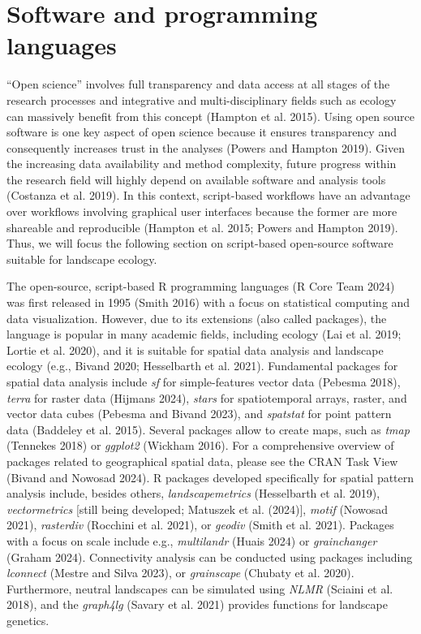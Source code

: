 \documentclass[
  10pt,
  a4paperpaper,
]{article}
\begin{document}
\section{Software and programming
languages}\label{software-and-programming-languages}

``Open science'' involves full transparency and data access at all
stages of the research processes and integrative and multi-disciplinary
fields such as ecology can massively benefit from this concept (Hampton
et al. 2015). Using open source software is one key aspect of open
science because it ensures transparency and consequently increases trust
in the analyses (Powers and Hampton 2019). Given the increasing data
availability and method complexity, future progress within the research
field will highly depend on available software and analysis tools
(Costanza et al. 2019). In this context, script-based workflows have an
advantage over workflows involving graphical user interfaces because the
former are more shareable and reproducible (Hampton et al. 2015; Powers
and Hampton 2019). Thus, we will focus the following section on
script-based open-source software suitable for landscape ecology.

The open-source, script-based R programming languages (R Core Team 2024)
was first released in 1995 (Smith 2016) with a focus on statistical
computing and data visualization. However, due to its extensions (also
called packages), the language is popular in many academic fields,
including ecology (Lai et al. 2019; Lortie et al. 2020), and it is
suitable for spatial data analysis and landscape ecology (e.g., Bivand
2020; Hesselbarth et al. 2021). Fundamental packages for spatial data
analysis include \emph{sf} for simple-features vector data (Pebesma
2018), \emph{terra} for raster data (Hijmans 2024), \emph{stars} for
spatiotemporal arrays, raster, and vector data cubes (Pebesma and Bivand
2023), and \emph{spatstat} for point pattern data (Baddeley et al.
2015). Several packages allow to create maps, such as \emph{tmap}
(Tennekes 2018) or \emph{ggplot2} (Wickham 2016). For a comprehensive
overview of packages related to geographical spatial data, please see
the CRAN Task View (Bivand and Nowosad 2024). R packages developed
specifically for spatial pattern analysis include, besides others,
\emph{landscapemetrics} (Hesselbarth et al. 2019), \emph{vectormetrics}
{[}still being developed; Matuszek et al. (2024){]}, \emph{motif}
(Nowosad 2021), \emph{rasterdiv} (Rocchini et al. 2021), or
\emph{geodiv} (Smith et al. 2021). Packages with a focus on scale
include e.g., \emph{multilandr} (Huais 2024) or \emph{grainchanger}
(Graham 2024). Connectivity analysis can be conducted using packages
including \emph{lconnect} (Mestre and Silva 2023), or \emph{grainscape}
(Chubaty et al. 2020). Furthermore, neutral landscapes can be simulated
using \emph{NLMR} (Sciaini et al. 2018), and the \emph{graph4lg} (Savary
et al. 2021) provides functions for landscape genetics.
\end{document}
